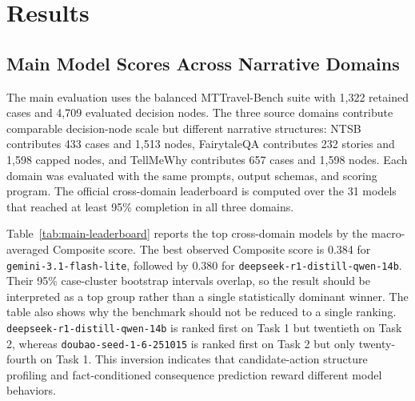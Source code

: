 \documentclass[pdflatex,sn-mathphys-num]{sn-jnl}%
\theoremstyle{thmstyleone}%
\theoremstyle{thmstyletwo}%
\theoremstyle{thmstylethree}%
\begin{document}
\section{Results}
\subsection{Main Model Scores Across Narrative Domains}
The main evaluation uses the balanced MTTravel-Bench suite with 1,322 retained cases and 4,709 evaluated decision nodes. The three source domains contribute comparable decision-node scale but different narrative structures: NTSB contributes 433 cases and 1,513 nodes, FairytaleQA contributes 232 stories and 1,598 capped nodes, and TellMeWhy contributes 657 cases and 1,598 nodes. Each domain was evaluated with the same prompts, output schemas, and scoring program. The official cross-domain leaderboard is computed over the 31 models that reached at least 95\% completion in all three domains.

Table~\ref{tab:main-leaderboard} reports the top cross-domain models by the macro-averaged Composite score. The best observed Composite score is 0.384 for \texttt{gemini-3.1-flash-lite}, followed by 0.380 for \texttt{deepseek-r1-distill-qwen-14b}. Their 95\% case-cluster bootstrap intervals overlap, so the result should be interpreted as a top group rather than a single statistically dominant winner. The table also shows why the benchmark should not be reduced to a single ranking. \texttt{deepseek-r1-distill-qwen-14b} is ranked first on Task 1 but twentieth on Task 2, whereas \texttt{doubao-seed-1-6-251015} is ranked first on Task 2 but only twenty-fourth on Task 1. This inversion indicates that candidate-action structure profiling and fact-conditioned consequence prediction reward different model behaviors.
\end{document}
